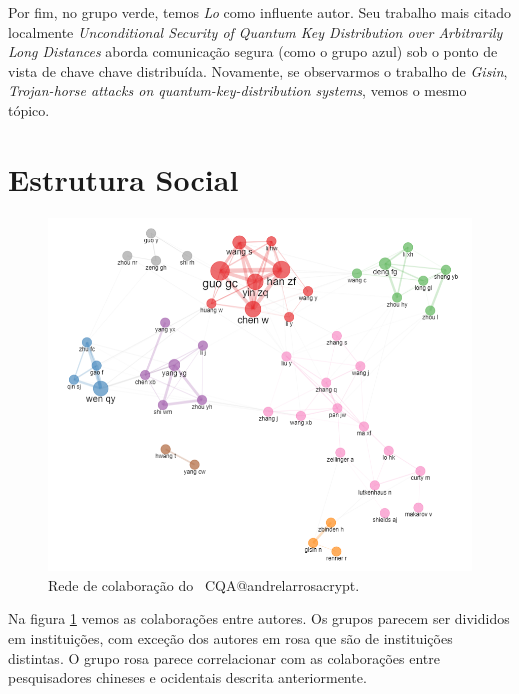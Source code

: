 Por fim, no grupo verde, temos \textit{Lo} como influente autor. Seu trabalho mais citado localmente \textit{Unconditional Security of Quantum Key Distribution over Arbitrarily Long Distances} aborda comunicação segura (como o grupo azul) sob o ponto de vista de chave chave distribuída. Novamente, se observarmos o trabalho de \textit{Gisin}, \textit{Trojan-horse attacks on quantum-key-distribution systems}, vemos o mesmo tópico.



\section{Estrutura Social}

\begin{figure}
    \centering
    \includegraphics[angle=0,width=1\textwidth]{experiments/andrelarrosacrypt/AnaliseBibliometrica/CriptografiaQuantica/imagens/CQA@andrelarrosacrypt_Colab.png}
    \caption{Rede de colaboração do \dataset\ CQA@andrelarrosacrypt.}
    \label{CQA@andrelarrosacrypt_Colab}
\end{figure}

Na figura \ref{CQA@andrelarrosacrypt_Colab} vemos as colaborações entre autores. Os grupos parecem ser divididos em instituições, com exceção dos autores em rosa que são de instituições distintas. O grupo rosa parece correlacionar com as colaborações entre pesquisadores chineses e ocidentais descrita anteriormente.

